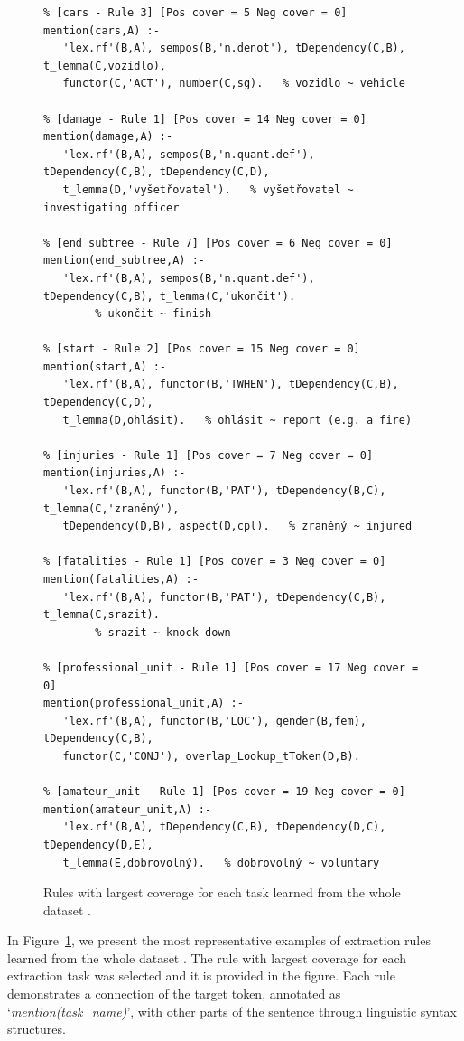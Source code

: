 \begin{figure}
\begin{verbatim}
% [cars - Rule 3] [Pos cover = 5 Neg cover = 0]
mention(cars,A) :-
   'lex.rf'(B,A), sempos(B,'n.denot'), tDependency(C,B), t_lemma(C,vozidlo), 
   functor(C,'ACT'), number(C,sg).   % vozidlo ~ vehicle

% [damage - Rule 1] [Pos cover = 14 Neg cover = 0]
mention(damage,A) :-
   'lex.rf'(B,A), sempos(B,'n.quant.def'), tDependency(C,B), tDependency(C,D), 
   t_lemma(D,'vyšetřovatel').   % vyšetřovatel ~ investigating officer

% [end_subtree - Rule 7] [Pos cover = 6 Neg cover = 0]
mention(end_subtree,A) :-
   'lex.rf'(B,A), sempos(B,'n.quant.def'), tDependency(C,B), t_lemma(C,'ukončit').
	    % ukončit ~ finish

% [start - Rule 2] [Pos cover = 15 Neg cover = 0]
mention(start,A) :-
   'lex.rf'(B,A), functor(B,'TWHEN'), tDependency(C,B), tDependency(C,D), 
   t_lemma(D,ohlásit).   % ohlásit ~ report (e.g. a fire)

% [injuries - Rule 1] [Pos cover = 7 Neg cover = 0]
mention(injuries,A) :-
   'lex.rf'(B,A), functor(B,'PAT'), tDependency(B,C), t_lemma(C,'zraněný'), 
   tDependency(D,B), aspect(D,cpl).   % zraněný ~ injured

% [fatalities - Rule 1] [Pos cover = 3 Neg cover = 0]
mention(fatalities,A) :-
   'lex.rf'(B,A), functor(B,'PAT'), tDependency(C,B), t_lemma(C,srazit).
	    % srazit ~ knock down

% [professional_unit - Rule 1] [Pos cover = 17 Neg cover = 0]
mention(professional_unit,A) :-
   'lex.rf'(B,A), functor(B,'LOC'), gender(B,fem), tDependency(C,B), 
   functor(C,'CONJ'), overlap_Lookup_tToken(D,B).

% [amateur_unit - Rule 1] [Pos cover = 19 Neg cover = 0]
mention(amateur_unit,A) :-
   'lex.rf'(B,A), tDependency(C,B), tDependency(D,C), tDependency(D,E), 
   t_lemma(E,dobrovolný).   % dobrovolný ~ voluntary
\end{verbatim}
	\caption{Rules with largest coverage for each task learned from the whole dataset .}
	\label{fig:learning_eval_rules}
\end{figure}

In Figure~\ref{fig:learning_eval_rules}, we present the most representative examples of extraction rules learned from the whole dataset . The rule with largest coverage for each extraction task was selected and it is provided in the figure. Each rule demonstrates a connection of the target token, annotated as `\emph{mention(task\_name)}’, with other parts of the sentence through linguistic syntax structures. 


